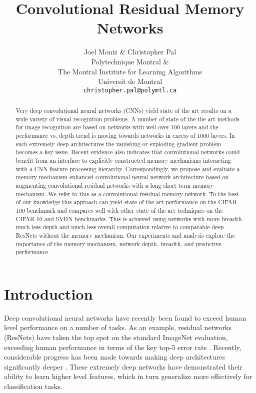 \documentclass{article}
\title{Convolutional Residual Memory Networks}
\author{
  Joel Moniz \& Christopher Pal \\
  Polytechnique Montral \& \\
  The Montral Institute for Learning Algorithms\\
  Universit de Montral \\
  \texttt{christopher.pal@polymtl.ca} \\
}
\begin{document}
\maketitle

\begin{abstract}
Very deep convolutional neural networks (CNNs) yield state of the art results on a wide variety of visual recognition problems. A number of state of the the art methods for image recognition are based on networks with well over 100 layers and the performance vs. depth trend is moving towards networks in excess of 1000 layers. In such extremely deep architectures the vanishing or exploding gradient problem becomes a key issue. Recent evidence also indicates that convolutional networks could benefit from an interface to explicitly constructed memory mechanisms interacting with a CNN feature processing hierarchy. Correspondingly, we propose and evaluate a memory mechanism enhanced convolutional neural network architecture based on augmenting convolutional residual networks with a long short term memory mechanism. We refer to this as a convolutional residual memory network. To the best of our knowledge this approach can yield state of the art performance on the CIFAR-100 benchmark and compares well with other state of the art techniques on the CIFAR-10 and SVHN benchmarks. This is achieved using networks with more breadth, much less depth and much less overall computation relative to comparable deep ResNets without the memory mechanism. Our experiments and analysis explore the importance of the memory mechanism, network depth, breadth, and predictive performance.
\end{abstract}

\section{Introduction}

Deep convolutional neural networks have recently been found to exceed human level performance on a number of tasks. As an example, residual networks (ResNets) have taken the top spot on the standard ImageNet evaluation, exceeding human performance in terms of the key top-5 error rate \cite{he2015deep}.
Recently, considerable progress has been made towards making deep architectures significantly deeper \cite{simonyan2014very, szegedy2015going, srivastava2015training, he2015deep, he2016identity}. %
These extremely deep networks have demonstrated their ability to learn higher level features, which in turn generalize more effectively for classification tasks.
\end{document}
